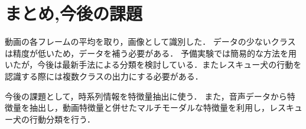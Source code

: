 \documentclass[twocolumn, a4paper]{UECIEresume}
\begin{document}
\section{まとめ,今後の課題}
動画の各フレームの平均を取り，画像として識別した．
データの少ないクラスは精度が低いため，データを補う必要がある．
予備実験では簡易的な方法を用いたが，今後は最新手法による分類を検討している．またレスキュー犬の行動を認識する際には複数クラスの出力にする必要がある．


今後の課題として，時系列情報を特徴量抽出に使う．
また，音声データから特徴量を抽出し，動画特徴量と併せたマルチモーダルな特徴量を利用し，レスキュー犬の行動分類を行う．


{\scriptsize %
%


}
% 
% 
\end{document}
